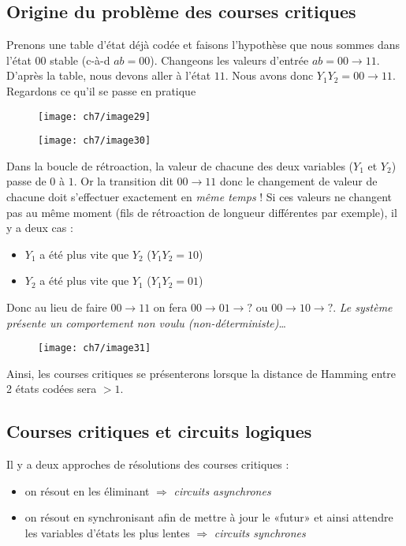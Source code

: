 \subsection{Origine du problème des courses critiques}
Prenons une table d'état déjà codée et faisons l'hypothèse que nous sommes dans l'état $00$ stable (c-à-d $ab=00$). Changeons les valeurs d'entrée $ab=00\rightarrow 11$. D'après la table, nous devons aller à l'état $11$. Nous avons donc $Y_1Y_2=00\rightarrow 11$. Regardons ce qu'il se passe en pratique
\begin{figure}[H]
	\centering
	\texttt{[image: ch7/image29]}
\end{figure}
\begin{figure}[H]
	\centering
	\texttt{[image: ch7/image30]}
\end{figure}
Dans la boucle de rétroaction, la valeur de chacune des deux variables ($Y_1$ et $Y_2$) passe de $0$ à $1$. Or la transition dit $00\rightarrow 11$ donc le changement de valeur de chacune doit s'effectuer exactement en \emph{même temps} ! Si ces valeurs ne changent pas au même moment (fils de rétroaction de longueur différentes par exemple), il y a deux cas :
\begin{itemize}
	\item $Y_1$ a été plus vite que $Y_2$ ($Y_1Y_2=10$)
	\item $Y_2$ a été plus vite que $Y_1$ ($Y_1Y_2=01$)
\end{itemize} 
Donc au lieu de faire $00\rightarrow 11$ on fera $00\rightarrow 01\rightarrow ?$ ou  $00\rightarrow 10\rightarrow ?$. \emph{Le système présente un comportement non voulu (non-déterministe)}\dots
\begin{figure}[H]
	\centering
	\texttt{[image: ch7/image31]}
\end{figure}
Ainsi, les courses critiques se présenterons lorsque la distance de Hamming entre 2 états codées sera $>1$.
\subsection{Courses critiques et circuits logiques}
Il y a deux approches de résolutions des courses critiques :
\begin{itemize}
	\item on résout en les éliminant $\Rightarrow$ \emph{circuits asynchrones}
	\item on résout en synchronisant afin de mettre à jour le «futur» et ainsi attendre les variables d'états les plus lentes $\Rightarrow$ \emph{circuits synchrones} 
\end{itemize}


